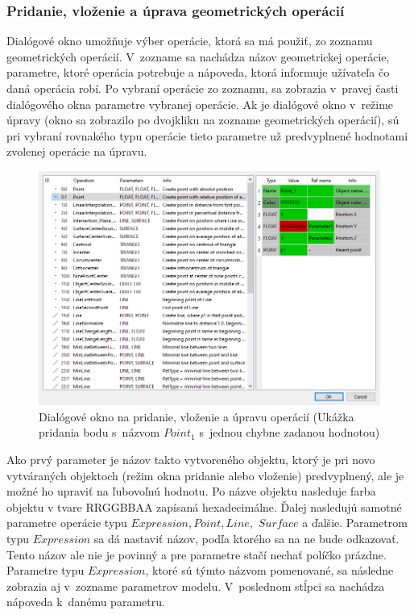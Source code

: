 

\subsubsection{Pridanie, vloženie a úprava geometrických operácií} 
Dialógové okno umožňuje výber operácie,  ktorá sa má použiť, zo zoznamu geometrických operácií. V~zozname sa nachádza názov geometrickej operácie, parametre, ktoré operácia potrebuje a nápoveda, ktorá informuje užívateľa čo daná operácia robí.
Po vybraní operácie zo zoznamu, sa zobrazia v~pravej časti dialógového okna parametre vybranej operácie. Ak je dialógové okno v~režime úpravy (okno sa zobrazilo po dvojkliku na zozname geometrických operácií), sú pri vybraní rovnakého typu operácie tieto parametre už predvyplnené hodnotami zvolenej operácie na úpravu.


\begin{figure}[H]
	\centering
	\includegraphics[width=1\textwidth]{obrazky-figures/Dialog.png}
	\caption{Dialógové okno na pridanie, vloženie a úpravu operácií (Ukážka pridania bodu s~názvom $Point_1$ s~jednou chybne zadanou hodnotou) }
	\label{fig:dialogWindow}
\end{figure}

Ako prvý parameter je názov takto vytvoreného objektu, ktorý je pri novo vytváraných objektoch (režim okna pridanie alebo vloženie) predvyplnený, ale je možné ho upraviť na ľubovoľnú hodnotu.  
Po názve objektu nasleduje farba objektu v tvare RRGGBBAA zapísaná hexadecimálne.
Ďalej nasledujú samotné parametre operácie typu $Expression,  Point, Line,$ $ Surface$ a ďalšie. Parametrom typu $Expression$ sa dá nastaviť názov, podľa ktorého sa na ne bude odkazovať. Tento názov ale nie je povinný a pre parametre stačí nechať políčko prázdne. Parametre typu $Expression$, ktoré sú týmto názvom pomenované, sa následne zobrazia aj v~zozname parametrov modelu.
V~poslednom stĺpci sa nachádza nápoveda k~danému parametru.

